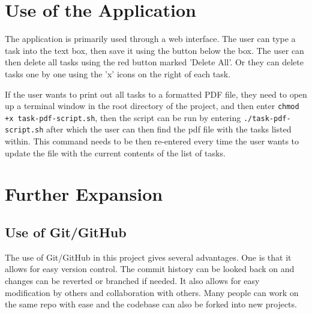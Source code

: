 \documentclass[12pt]{extarticle}
\begin{document}
\section{Use of the Application}
The application is primarily used through a web interface. The user can type a task into the text box, then save it using the button below the box. The user can then delete all tasks using the red button marked 'Delete All'. Or they can delete tasks one by one using the 'x' icons on the right of each task.

If the user wants to print out all tasks to a formatted PDF file, they need to open up a terminal window in the root directory of the project, and then enter  \lstinline|chmod +x task-pdf-script.sh|, then the script can be run by entering \lstinline|./task-pdf-script.sh| after which the user can then find the pdf file with the tasks listed within. This command needs to be then re-entered every time the user wants to update the file with the current contents of the list of tasks.


\section{Further Expansion}
\subsection{Use of Git/GitHub}
The use of Git/GitHub in this project gives several advantages. One is that it allows for easy version control. The commit history can be looked back on and changes can be reverted or branched if needed. It also allows for easy modification by others and collaboration with others. Many people can work on the same repo with ease and the codebase can also be forked into new projects. 
\end{document}
